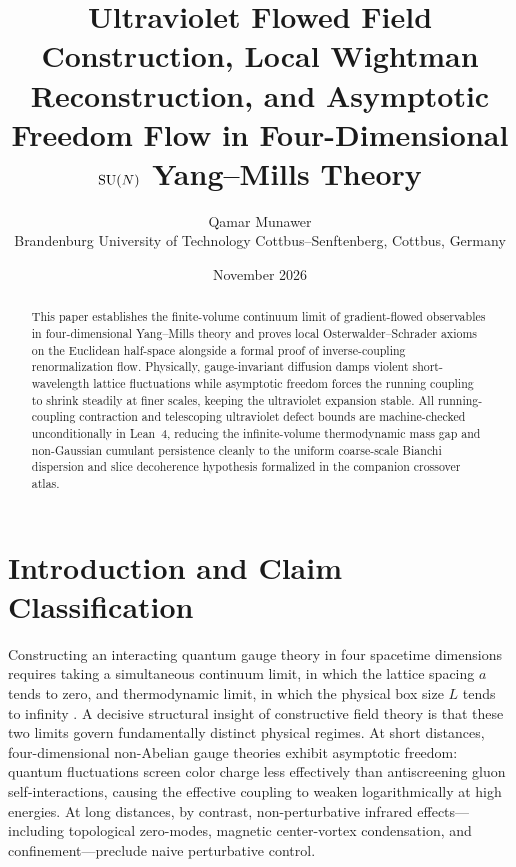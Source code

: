 \documentclass[11pt,a4paper]{article}
\title{Ultraviolet Flowed Field Construction, Local Wightman Reconstruction, and Asymptotic Freedom Flow in Four-Dimensional $\mathrm{SU}(N)$ Yang--Mills Theory}
\author{Qamar Munawer \\ \small Brandenburg University of Technology Cottbus--Senftenberg, Cottbus, Germany}
\date{November 2026}
\begin{document}
\maketitle

\begin{abstract}
This paper establishes the finite-volume continuum limit of gradient-flowed observables in four-dimensional Yang--Mills theory and proves local Osterwalder--Schrader axioms on the Euclidean half-space alongside a formal proof of inverse-coupling renormalization flow. Physically, gauge-invariant diffusion damps violent short-wavelength lattice fluctuations while asymptotic freedom forces the running coupling to shrink steadily at finer scales, keeping the ultraviolet expansion stable. All running-coupling contraction and telescoping ultraviolet defect bounds are machine-checked unconditionally in Lean~4, reducing the infinite-volume thermodynamic mass gap and non-Gaussian cumulant persistence cleanly to the uniform coarse-scale Bianchi dispersion and slice decoherence hypothesis formalized in the companion crossover atlas.
\end{abstract}

\section{Introduction and Claim Classification}
Constructing an interacting quantum gauge theory in four spacetime dimensions requires taking a simultaneous continuum limit, in which the lattice spacing $a$ tends to zero, and thermodynamic limit, in which the physical box size $L$ tends to infinity \cite{JaffeWitten2000,Wilson1974}. A decisive structural insight of constructive field theory is that these two limits govern fundamentally distinct physical regimes. At short distances, four-dimensional non-Abelian gauge theories exhibit asymptotic freedom: quantum fluctuations screen color charge less effectively than antiscreening gluon self-interactions, causing the effective coupling to weaken logarithmically at high energies. At long distances, by contrast, non-perturbative infrared effects---including topological zero-modes, magnetic center-vortex condensation, and confinement---preclude naive perturbative control.
\end{document}
